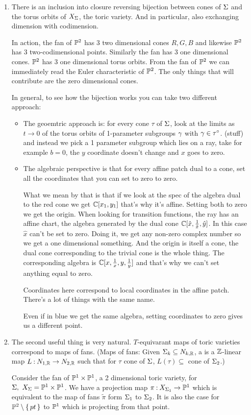 \documentclass[12pt]{memoir}
\begin{document}
\begin{enumerate}
    \item There is an inclusion into closure reversing bijection between cones of $\Sigma$ and the torus orbits of $X_\Sigma$, the toric variety. And in particular, also exchanging dimension with codimension.\par 
    In action, the fan of $\mathbb{P}^2$ has 3 two dimensional cones $R,G,B$ and likewise $\mathbb{P}^2$ has 3 two-codimensional points. Similarly the fan has 3 one dimensional cones. $\mathbb{P}^2$ has 3 one dimensional torus orbits. From the fan of $\mathbb{P}^2$ we can immediately read the Euler characteristic of $\mathbb{P}^2$. The only things that will contribute are the zero dimensional cones.\par 
    In general, to see how the bijection works you can take two different approach:
    \begin{itemize}
        \item The geoemtric approach is: for every cone $\tau$ of $\Sigma$, look at the limits as $t\to 0$ of the torus orbits of 1-parameter subgroups $\gamma$ with $\gamma\in\tau^\circ$. (stuff) and instead we pick a 1 parameter subgroup which lies on a ray, take for example $b=0$, the $y$ coordinate doesn't change and $x$ goes to zero.
        \item The algebraic perspective is that for every affine patch dual to a cone, set all the coordinates that you can set to zero to zero. \par 
        What we mean by that is that if we look at the spec of the algebra dual to  the red cone we get $\mathbb{C}[x_1,y_1]$ that's why it's affine. Setting both to zero we get the origin. When looking for transition functions, the ray has an affine chart, the algebra generated by the dual cone $\mathbb{C}[\hat x,\frac{1}{\hat x},\hat y]$. In this case $\hat x$ can't be set to zero. Doing it, we get any non-zero complex number so we get a one dimensional something. And the origin is itself a cone, the dual cone corresponding to the trivial cone is the whole thing. The corresponding algebra is $\mathbb{C}[x,\frac1x,y,\frac1y]$ and that's why we can't set anything equal to zero.
        \begin{significant}
            Coordinates here correspond to local coordinates in the affine patch. There's a lot of things with the same name. 
        \end{significant}
        Even if in blue we get the same algebra, setting coordinates to zero gives us a different point.
    \end{itemize}
    \item The second useful thing is very natural. $T$-equivarant maps of toric varieties correspond to maps of fans. (Maps of fans: Given $\Sigma_k\subseteq N_{k,\mathbb{R}}$, a  is a $\mathbb{Z}$-linear map $L\mathbin{:} N_{1,\mathbb{R}}\to N_{2,\mathbb{R}}$ such that for $\tau$ cone of $\Sigma$, $L(\tau)\subseteq$ cone of $\Sigma_2$.)\par 
    Consider the fan of $\mathbb{P}^1\times\mathbb{P}^1$, a 2 dimensional toric variety, for $\Sg,\ X_\Sg=\bP^1\x\bP^1$. We have a projection map $\pi\mathbin{:} X_{\Sigma_1}\to\mathbb{P}^1$ which is equivalent to the map of fans $\tilde{\pi}$ form $\Sigma_1$ to $\Sigma_2$. It is also the case for $\mathbb{P}^2\setminus\{\,pt\,\}$ to $\mathbb{P}^1$ which is projecting from that point.
\end{enumerate}
\end{document}
